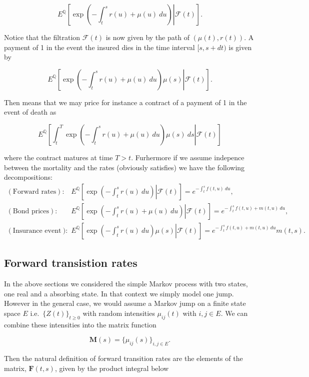 \documentclass[
]{book}
\begin{document}
\[
E^{\mathbb Q}\left[\left. \exp\left(-\int_t^sr(u)+\mu(u)\ du\right)\right\vert \mathcal F(t)\right].
\]

Notice that the filtration \(\mathcal F(t)\) is now given by the path of \((\mu(t),r(t))\). A payment of 1 in the event the insured dies in the time interval \([s,s+dt)\) is given by

\[
E^{\mathbb Q}\left[\left. \exp\left(-\int_t^sr(u)+\mu(u)\ du\right)\mu(s)\right\vert \mathcal F(t)\right].
\]

Then means that we may price for instance a contract of a payment of 1 in the event of death as

\[
E^{\mathbb Q}\left[\left. \int_t^T\exp\left(-\int_t^sr(u)+\mu(u)\ du\right)\mu(s)\ ds\right\vert \mathcal F(t)\right]
\]

where the contract matures at time \(T>t\). Furhermore if we assume indepence between the mortality and the rates (obviously satisfies) we have the following decompositions:
\begin{align*}
(\text{Forward rates}):\qquad& E^{\mathbb Q}\left[\left. \exp\left(-\int_t^sr(u)\ du\right)\right\vert \mathcal F(t)\right]=e^{-\int_t^sf(t,u)\ du},\\
(\text{Bond prices}):\qquad& E^{\mathbb Q}\left[\left. \exp\left(-\int_t^sr(u)+\mu(u)\ du\right)\right\vert \mathcal F(t)\right]=e^{-\int_t^sf(t,u)+m(t,u)\ du},\\
(\text{Insurance event}):\qquad& E^{\mathbb Q}\left[\left. \exp\left(-\int_t^sr(u)\ du\right)\mu(s)\right\vert \mathcal F(t)\right]=e^{-\int_t^sf(t,u)+m(t,u)\ du}m(t,s).
\end{align*}

\hypertarget{forward-transistion-rates}{%
\subsection{Forward transistion rates}\label{forward-transistion-rates}}

In the above sections we considered the simple Markov process with two states, one real and a absorbing state. In that context we simply model one jump. However in the general case, we would assume a Markov jump on a finite state space \(E\) i.e.~\(\{Z(t)\}_{t\ge 0}\) with random intensities \(\mu_{ij}(t)\) with \(i,j\in E\). We can combine these intensities into the matrix function

\[
\mathbf M(s)=\{\mu_{ij}(s)\}_{i,j\in E}.
\]

Then the natural definition of forward transition rates are the elements of the matrix, \(\mathbf F(t,s)\), given by the product integral below
\end{document}

